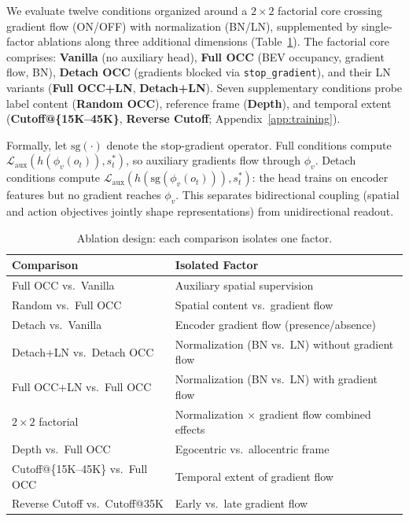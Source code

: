 We evaluate twelve conditions organized around a $2{\times}2$ factorial core crossing gradient flow (ON/OFF) with normalization (BN/LN), supplemented by single-factor ablations along three additional dimensions (Table~\ref{tab:ablation_design}). The factorial core comprises: \textbf{Vanilla} (no auxiliary head), \textbf{Full OCC} (BEV occupancy, gradient flow, BN), \textbf{Detach OCC} (gradients blocked via \texttt{stop\_gradient}), and their LN variants (\textbf{Full OCC+LN}, \textbf{Detach+LN}). Seven supplementary conditions probe label content (\textbf{Random OCC}), reference frame (\textbf{Depth}), and temporal extent (\textbf{Cutoff@\{15K--45K\}}, \textbf{Reverse Cutoff}; Appendix~\ref{app:training}).

Formally, let $\text{sg}(\cdot)$ denote the stop-gradient operator. Full conditions compute $\mathcal{L}_\text{aux}(h(\phi_v(o_t)), s_t^*)$, so auxiliary gradients flow through $\phi_v$. Detach conditions compute $\mathcal{L}_\text{aux}(h(\text{sg}(\phi_v(o_t))), s_t^*)$: the head trains on encoder features but no gradient reaches $\phi_v$. This separates bidirectional coupling (spatial and action objectives jointly shape representations) from unidirectional readout.

\begin{table}[t]
\centering
\small
\setlength{\tabcolsep}{4pt}
\caption{Ablation design: each comparison isolates one factor.}
\label{tab:ablation_design}
\begin{tabular}{@{}ll@{}}
\toprule
Comparison & Isolated Factor \\
\midrule
Full OCC vs.\ Vanilla & Auxiliary spatial supervision \\
Random vs.\ Full OCC & Spatial content vs.\ gradient flow \\
Detach vs.\ Vanilla & Encoder gradient flow (presence/absence) \\
Detach+LN vs.\ Detach OCC & Normalization (BN vs.\ LN) without gradient flow \\
Full OCC+LN vs.\ Full OCC & Normalization (BN vs.\ LN) with gradient flow \\
$2{\times}2$ factorial & Normalization $\times$ gradient flow combined effects \\
Depth vs.\ Full OCC & Egocentric vs.\ allocentric frame \\
Cutoff@\{15K--45K\} vs.\ Full OCC & Temporal extent of gradient flow \\
Reverse Cutoff vs.\ Cutoff@35K & Early vs.\ late gradient flow \\
\bottomrule
\end{tabular}
\end{table}

